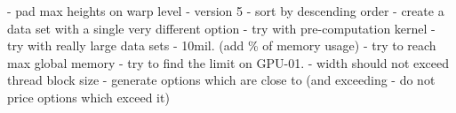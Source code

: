 - pad max heights on warp level - version 5
- sort by descending order
- create a data set with a single very different option
- try with pre-computation kernel
- try with really large data sets - 10mil. (add \% of memory usage) - try to reach max global memory - try to find the limit on GPU-01.
- width should not exceed thread block size - generate options which are close to (and exceeding - do not price options which exceed it)